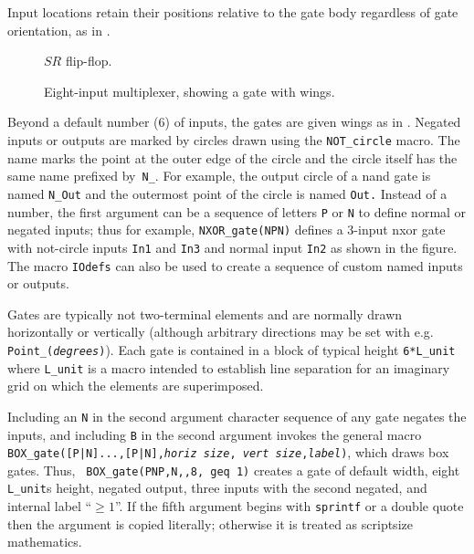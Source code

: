 Input locations retain their positions relative to the gate body
regardless of gate orientation, as in .
\begin{figure}[ht]
   \vspace*{-\baselineskip}
   \parbox{4.75in}{\small }%
   
   \vspace*{-\baselineskip}
   \caption{$SR$ flip-flop.}
   \label{FF}
   \end{figure}
\begin{figure}[ht]
   
   \caption{Eight-input multiplexer, showing a gate with wings.}
   \label{exVIII}
   \end{figure}
Beyond a default number (6) of inputs, the
gates are given wings as in .
Negated inputs or outputs are marked by circles drawn using the
\verb|NOT_circle| macro.  The name marks the point at the outer edge of the
circle and the circle itself has the same name prefixed by~{\tt N\_}.
For example, the output circle of a nand gate is named
{\tt N\_Out} and the outermost point of the circle is named {\tt Out.}
Instead of a number, the first argument can be a sequence of letters {\tt P}
or {\tt N} to define normal or negated inputs; thus for example,
{\tt NXOR\_gate(NPN)} defines a 3-input nxor gate with not-circle
inputs {\tt In1} and {\tt In3} and normal input {\tt In2}
as shown in the figure.
The macro {\tt IOdefs} can also be used to create a sequence of custom
named inputs or outputs.

Gates are typically not two-terminal elements and are normally drawn
horizontally or vertically (although arbitrary directions may be set
with e.g. {\tt Point\_({\sl degrees})}).
Each gate is contained in a
block of typical height {\tt 6*L\_unit} where {\tt L\_unit} is a macro
intended to establish line separation for an imaginary grid on which
the elements are superimposed.

Including an \verb|N| in the second
argument character sequence of any gate negates the inputs, and including
\verb|B| in the second argument invokes the
general macro {\tt BOX\_gate([P|N]...,[P|N],{\sl horiz size},{\sl
vert size},{\sl label})}, which draws box gates.  Thus, {\tt
BOX\_gate(PNP,N,,8, geq 1)} creates a gate of default width,
eight {\tt L\_unit}s height, negated output, three inputs with the
second negated, and internal label ``$\geq1$''.
If the fifth argument begins with {\tt sprintf} or a double quote then
the argument is copied literally; otherwise it is treated as scriptsize
mathematics.

